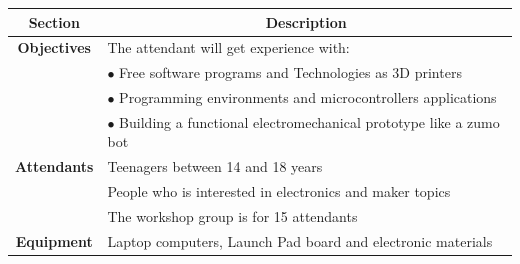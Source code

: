 \documentclass[]{article}
\begin{document}
\begin{table}[h!]
	\centering
	\begin{tabular}{||c|l||}
		
		
		
		
		
		
		
		\hline
		\textbf{Section} & \multicolumn{1}{|c|}{\textbf{Description}}       \\[0.5ex]\hline\hline
				
		\textbf{Objectives} & The attendant will get experience with:    \\[0.5ex] 
		& $\bullet$ Free software programs and Technologies as 3D printers \\[0.5ex]
		& $\bullet$ Programming environments and microcontrollers applications\\[0.5ex]
		
			& $\bullet$ Building a functional electromechanical prototype like a zumo bot\\[0.5ex]
		\hline
		
		\textbf{Attendants} &  Teenagers between 14 and 18 years   \\[0.5ex]
		& People who is interested in electronics and maker topics   \\[0.5ex]
		& The workshop group is for 15 attendants    \\[0.5ex] \hline
		
		\textbf{Equipment} & Laptop computers, Launch Pad board and electronic materials  \\[0.5ex] \hline
		

\end{tabular}
\end{table}
\end{document}
